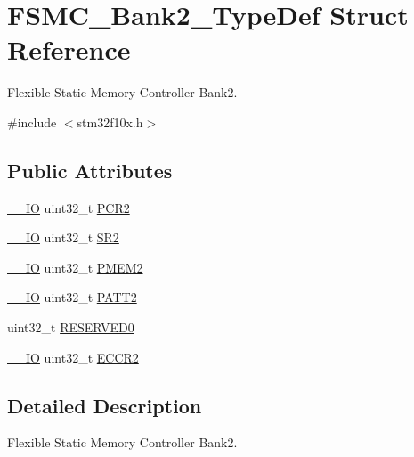 \hypertarget{struct_f_s_m_c___bank2___type_def}{\section{F\-S\-M\-C\-\_\-\-Bank2\-\_\-\-Type\-Def Struct Reference}
\label{struct_f_s_m_c___bank2___type_def}
}


Flexible Static Memory Controller Bank2.  




{\ttfamily \#include $<$stm32f10x.\-h$>$}

\subsection*{Public Attributes}
\begin{DoxyCompactItemize}
\item 
\hyperlink{group___c_m_s_i_s__core__definitions_gaec43007d9998a0a0e01faede4133d6be}{\-\_\-\-\_\-\-I\-O} uint32\-\_\-t \hyperlink{struct_f_s_m_c___bank2___type_def_ad1eabc89a4eadb5cc6a42c1e39a39ff8}{P\-C\-R2}
\item 
\hyperlink{group___c_m_s_i_s__core__definitions_gaec43007d9998a0a0e01faede4133d6be}{\-\_\-\-\_\-\-I\-O} uint32\-\_\-t \hyperlink{struct_f_s_m_c___bank2___type_def_a38ad7403e05c899dc266cf47f932cc8f}{S\-R2}
\item 
\hyperlink{group___c_m_s_i_s__core__definitions_gaec43007d9998a0a0e01faede4133d6be}{\-\_\-\-\_\-\-I\-O} uint32\-\_\-t \hyperlink{struct_f_s_m_c___bank2___type_def_a29b2b75e74520e304e31c18cf9e4a7f8}{P\-M\-E\-M2}
\item 
\hyperlink{group___c_m_s_i_s__core__definitions_gaec43007d9998a0a0e01faede4133d6be}{\-\_\-\-\_\-\-I\-O} uint32\-\_\-t \hyperlink{struct_f_s_m_c___bank2___type_def_a9b2c273e4b84f24efbd731bd4ba76a84}{P\-A\-T\-T2}
\item 
uint32\-\_\-t \hyperlink{struct_f_s_m_c___bank2___type_def_ac0433330a92f2bd04812384f63bb4a52}{R\-E\-S\-E\-R\-V\-E\-D0}
\item 
\hyperlink{group___c_m_s_i_s__core__definitions_gaec43007d9998a0a0e01faede4133d6be}{\-\_\-\-\_\-\-I\-O} uint32\-\_\-t \hyperlink{struct_f_s_m_c___bank2___type_def_afebea17b3ac79d86ad59ce299ab5dd83}{E\-C\-C\-R2}
\end{DoxyCompactItemize}


\subsection{Detailed Description}
Flexible Static Memory Controller Bank2. 

